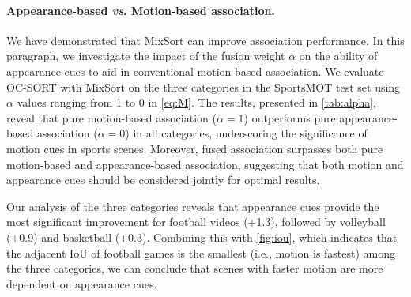 \documentclass[10pt,twocolumn,letterpaper]{article}
\begin{document}
\paragraph{Appearance-based \textit{vs}. Motion-based association.}
\begin{table}[pt]
\centering
{}
\vspace{-2mm}
\caption {Comparison of the HOTA metric of basketball, volley and football under different fusion parameters $\alpha$ on SportsMOT test set. The models are trained on SportsMOT training set.}
\label{tab:alpha}
\vspace{-6mm}
\end{table}
We have demonstrated that MixSort can improve association performance. 
In this paragraph, we investigate the impact of the fusion weight $\alpha$ on the ability of appearance cues to aid in conventional motion-based association. We evaluate OC-SORT with MixSort on the three categories in the SportsMOT test set using $\alpha$ values ranging from 1 to 0 in \cref{eq:M}. The results, presented in \cref{tab:alpha}, reveal that pure motion-based association ($\alpha=1$) outperforms pure appearance-based association ($\alpha=0$) in all categories, underscoring the significance of motion cues in sports scenes. Moreover, fused association surpasses both pure motion-based and appearance-based association, suggesting that both motion and appearance cues should be considered jointly for optimal results.

Our analysis of the three categories reveals that appearance cues provide the most significant improvement for football videos (+1.3), followed by volleyball (+0.9) and basketball (+0.3). Combining this with \cref{fig:iou}, which indicates that the adjacent IoU of football games is the smallest (i.e., motion is fastest) among the three categories, we can conclude that scenes with faster motion are more dependent on appearance cues.
\end{document}
